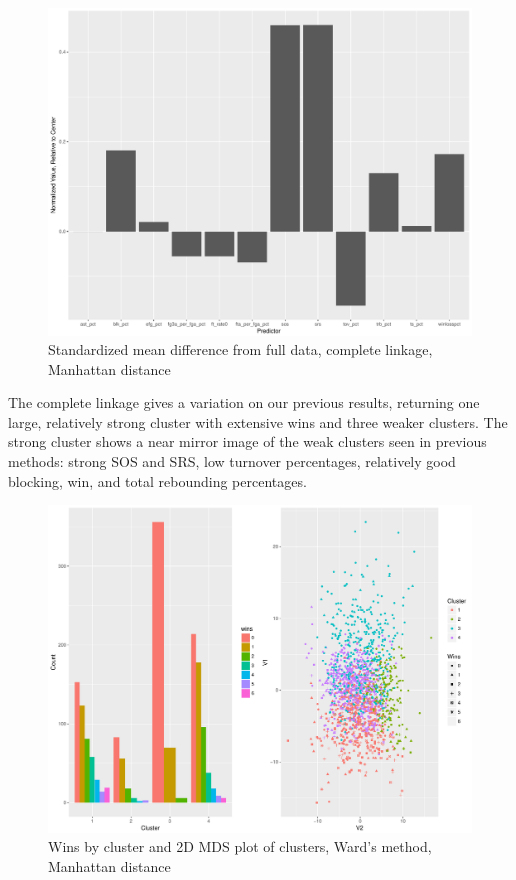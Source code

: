 \documentclass[10pt,a4paper, hidelinks]{article} %
\begin{document}
\begin{figure}[H]
	\centering
	\includegraphics[width=0.7\linewidth]{../fig/compweak2}
	\caption{Standardized mean difference from full data, complete linkage, Manhattan distance}
\end{figure}

The complete linkage gives a variation on our previous results, returning one large, relatively strong cluster with extensive wins and three weaker clusters.  The strong cluster shows a near mirror image of the weak clusters seen in previous methods: strong SOS and SRS, low turnover percentages, relatively good blocking, win, and total rebounding percentages.

\begin{figure}[H]
	\centering
	\includegraphics[width=0.7\linewidth]{../fig/ward2}
	\caption{Wins by cluster and 2D MDS plot of clusters, Ward's method, Manhattan distance}
\end{figure}
\end{document}
